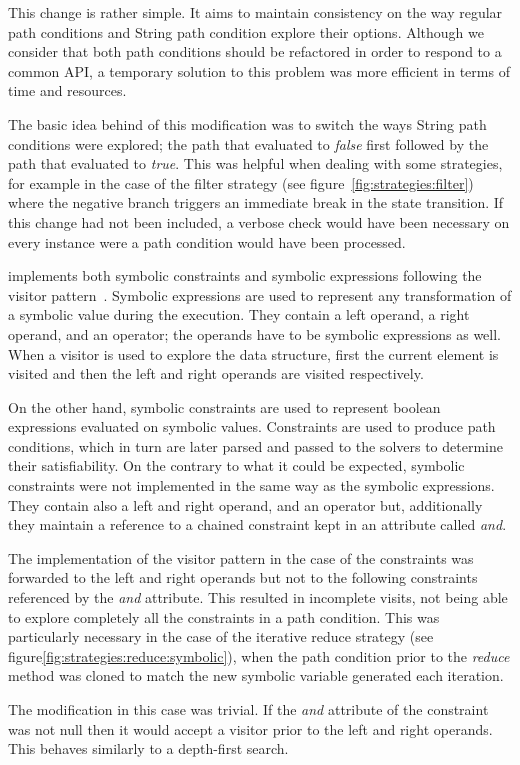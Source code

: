 
This change is rather simple. It aims to maintain consistency on the way regular path conditions and String path condition explore their options. Although we consider that both path conditions should be refactored in order to respond to a common API, a temporary solution to this problem was more efficient in terms of time and resources.

The basic idea behind of this modification was to switch the ways String path conditions were explored; the path that evaluated to \textit{false} first followed by the path that evaluated to \textit{true}. This was helpful when dealing with some strategies, for example in the case of the filter strategy (see figure~\ref{fig:strategies:filter}) where the negative branch triggers an immediate break in the state transition. If this change had not been included, a verbose check would have been necessary on every instance were a path condition would have been processed.


\spf{} implements both symbolic constraints and symbolic expressions following the visitor pattern~\cite{Gamma1994}. Symbolic expressions are used to represent any transformation of a symbolic value during the execution. They contain a left operand, a right operand, and an operator; the operands have to be symbolic expressions as well. When a visitor is used to explore the data structure, first the current element is visited and then the left and right operands are visited respectively. 

On the other hand, symbolic constraints are used to represent boolean expressions evaluated on symbolic values. Constraints are used to produce path conditions, which in turn are later parsed and passed to the solvers to determine their satisfiability. On the contrary to what it could be expected, symbolic constraints were not implemented in the same way as the symbolic expressions. They contain also a left and right operand, and an operator but, additionally they maintain a reference to a chained constraint kept in an attribute called \textit{and}.

The implementation of the visitor pattern in the case of the constraints was forwarded to the left and right operands but not to the following constraints referenced by the \textit{and} attribute. This resulted in incomplete visits, not being able to explore completely all the constraints in a path condition. This was particularly necessary in the case of the iterative reduce strategy (see figure\ref{fig:strategies:reduce:symbolic}), when the path condition prior to the \textit{reduce} method was cloned to match the new symbolic variable generated each iteration.

The modification in this case was trivial. If the \textit{and} attribute of the constraint was not null then it would accept a visitor prior to the left and right operands. This behaves similarly to a depth-first search.